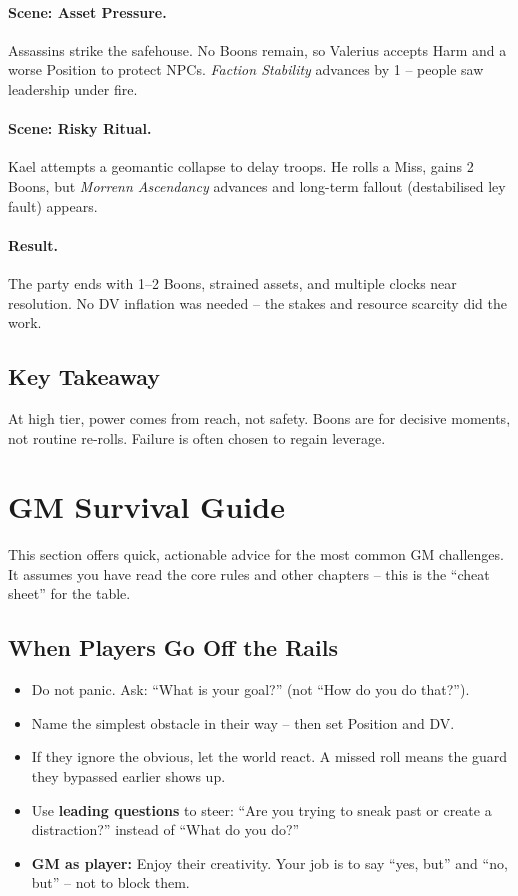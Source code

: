 \paragraph{Scene: Asset Pressure.} Assassins strike the safehouse. No Boons remain, so Valerius accepts Harm and a worse Position to protect NPCs. \emph{Faction Stability} advances by 1 – people saw leadership under fire.

\paragraph{Scene: Risky Ritual.} Kael attempts a geomantic collapse to delay troops. He rolls a Miss, gains 2 Boons, but \emph{Morrenn Ascendancy} advances and long-term fallout (destabilised ley fault) appears.

\paragraph{Result.} The party ends with 1–2 Boons, strained assets, and multiple clocks near resolution. No DV inflation was needed – the stakes and resource scarcity did the work.

\subsection*{Key Takeaway}
At high tier, power comes from reach, not safety. Boons are for decisive moments, not routine re‑rolls. Failure is often chosen to regain leverage.

\section{GM Survival Guide}

This section offers quick, actionable advice for the most common GM challenges. It assumes you have read the core rules and other chapters – this is the “cheat sheet” for the table.

\subsection*{When Players Go Off the Rails}
\begin{itemize}
  \item Do not panic. Ask: “What is your goal?” (not “How do you do that?”).
  \item Name the simplest obstacle in their way – then set Position and DV.
  \item If they ignore the obvious, let the world react. A missed roll means the guard they bypassed earlier shows up.
  \item Use \textbf{leading questions} to steer: “Are you trying to sneak past or create a distraction?” instead of “What do you do?”
  \item \textbf{GM as player:} Enjoy their creativity. Your job is to say “yes, but” and “no, but” – not to block them.
\end{itemize}

